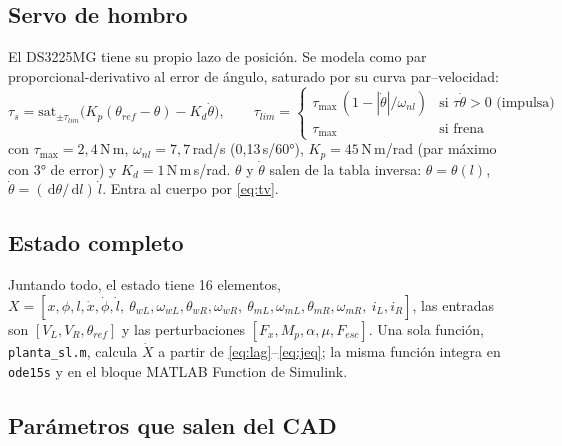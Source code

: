 \documentclass[11pt,a4paper]{article}
\newcommand{\code}[1]{\texttt{#1}}
\newcommand{\dd}{\,\mathrm{d}}
\begin{document}
\subsection{Servo de hombro}

El DS3225MG tiene su propio lazo de posición. Se modela como par proporcional-derivativo al error
de ángulo, saturado por su curva par--velocidad:
\begin{equation}
  \tau_s = \mathrm{sat}_{\pm\tau_{lim}}\big(K_p(\theta_{ref} - \theta) - K_d\dot\theta\big), \qquad
  \tau_{lim} = \begin{cases} \tau_{\max}\,(1 - |\dot\theta|/\omega_{nl}) & \text{si } \tau\dot\theta > 0 \text{ (impulsa)} \\ \tau_{\max} & \text{si frena} \end{cases}
\end{equation}
con $\tau_{\max} = 2{,}4$\,N\,m, $\omega_{nl} = 7{,}7$\,rad/s (0{,}13\,s/60°), $K_p = 45$\,N\,m/rad
(par máximo con 3° de error) y $K_d = 1$\,N\,m\,s/rad. $\theta$ y $\dot\theta$ salen de la tabla
inversa: $\theta = \theta(l)$, $\dot\theta = (\dd\theta/\dd l)\,\dot l$. Entra al cuerpo por
\eqref{eq:tv}.

\subsection{Estado completo}

Juntando todo, el estado tiene 16 elementos, $X = [x,\phi,l,\dot x,\dot\phi,\dot l,\ \theta_{wL},\omega_{wL},\theta_{wR},\omega_{wR},\ \theta_{mL},\omega_{mL},\theta_{mR},\omega_{mR},\ i_L,i_R]$,
las entradas son $[V_L, V_R, \theta_{ref}]$ y las perturbaciones $[F_x, M_p, \alpha, \mu, F_{esc}]$.
Una sola función, \code{planta\_sl.m}, calcula $\dot X$ a partir de \eqref{eq:lag}--\eqref{eq:jeq}; la
misma función integra en \code{ode15s} y en el bloque MATLAB Function de Simulink.

\subsection{Parámetros que salen del CAD}
\end{document}
